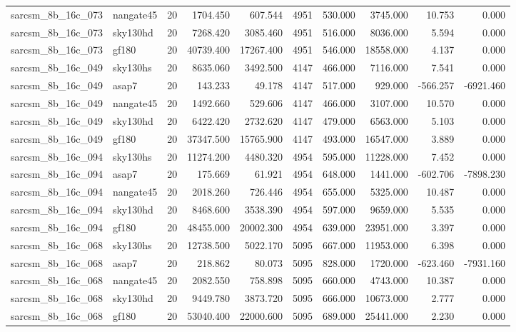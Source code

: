 \begin{longtable}{llrrrrrrrr}
sarcsm\_8b\_16c\_073 & nangate45 & 20 & 1704.450 & 607.544 & 4951 & 530.000 & 3745.000 & 10.753 & 0.000 \\
sarcsm\_8b\_16c\_073 & sky130hd & 20 & 7268.420 & 3085.460 & 4951 & 516.000 & 8036.000 & 5.594 & 0.000 \\
sarcsm\_8b\_16c\_073 & gf180 & 20 & 40739.400 & 17267.400 & 4951 & 546.000 & 18558.000 & 4.137 & 0.000 \\
sarcsm\_8b\_16c\_049 & sky130hs & 20 & 8635.060 & 3492.500 & 4147 & 466.000 & 7116.000 & 7.541 & 0.000 \\
sarcsm\_8b\_16c\_049 & asap7 & 20 & 143.233 & 49.178 & 4147 & 517.000 & 929.000 & -566.257 & -6921.460 \\
sarcsm\_8b\_16c\_049 & nangate45 & 20 & 1492.660 & 529.606 & 4147 & 466.000 & 3107.000 & 10.570 & 0.000 \\
sarcsm\_8b\_16c\_049 & sky130hd & 20 & 6422.420 & 2732.620 & 4147 & 479.000 & 6563.000 & 5.103 & 0.000 \\
sarcsm\_8b\_16c\_049 & gf180 & 20 & 37347.500 & 15765.900 & 4147 & 493.000 & 16547.000 & 3.889 & 0.000 \\
sarcsm\_8b\_16c\_094 & sky130hs & 20 & 11274.200 & 4480.320 & 4954 & 595.000 & 11228.000 & 7.452 & 0.000 \\
sarcsm\_8b\_16c\_094 & asap7 & 20 & 175.669 & 61.921 & 4954 & 648.000 & 1441.000 & -602.706 & -7898.230 \\
sarcsm\_8b\_16c\_094 & nangate45 & 20 & 2018.260 & 726.446 & 4954 & 655.000 & 5325.000 & 10.487 & 0.000 \\
sarcsm\_8b\_16c\_094 & sky130hd & 20 & 8468.600 & 3538.390 & 4954 & 597.000 & 9659.000 & 5.535 & 0.000 \\
sarcsm\_8b\_16c\_094 & gf180 & 20 & 48455.000 & 20002.300 & 4954 & 639.000 & 23951.000 & 3.397 & 0.000 \\
sarcsm\_8b\_16c\_068 & sky130hs & 20 & 12738.500 & 5022.170 & 5095 & 667.000 & 11953.000 & 6.398 & 0.000 \\
sarcsm\_8b\_16c\_068 & asap7 & 20 & 218.862 & 80.073 & 5095 & 828.000 & 1720.000 & -623.460 & -7931.160 \\
sarcsm\_8b\_16c\_068 & nangate45 & 20 & 2082.550 & 758.898 & 5095 & 660.000 & 4743.000 & 10.387 & 0.000 \\
sarcsm\_8b\_16c\_068 & sky130hd & 20 & 9449.780 & 3873.720 & 5095 & 666.000 & 10673.000 & 2.777 & 0.000 \\
sarcsm\_8b\_16c\_068 & gf180 & 20 & 53040.400 & 22000.600 & 5095 & 689.000 & 25441.000 & 2.230 & 0.000 \\

\end{longtable}
